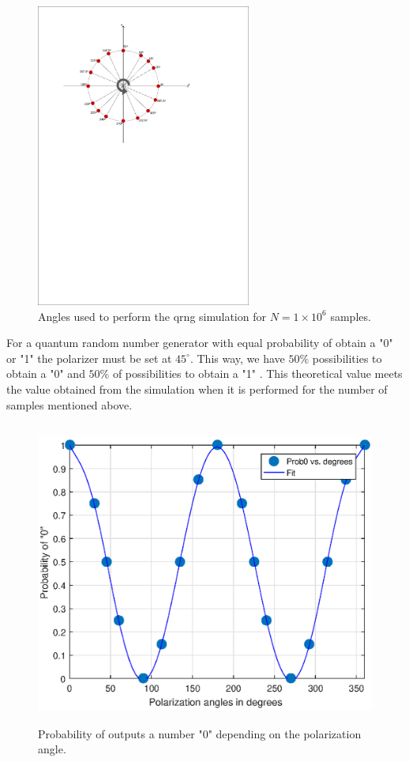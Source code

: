 \begin{figure}[H]
    \centering
        \includegraphics[clip, trim=0.5cm 15.5cm 2.5cm 1cm, height = 10cm]{./sdf/quantum_random_number_generator/figures/sphere.pdf}
    \caption{Angles used to perform the qrng simulation for $N=1 \times 10^{6}$ samples. }\label{sphere}
\end{figure}

For a quantum random number generator with equal probability of obtain a "0" \space or "1" \space the polarizer must be set at $45^{\circ}$. This way, we have $50\%$ possibilities to obtain a "0" \space and $50\%$ of possibilities to obtain a "1" \space. This theoretical value meets the value obtained from the simulation when it is performed for the number of samples mentioned above.

\begin{figure}[H]
    \centering
        \includegraphics[width=15cm,height=10cm]{./sdf/quantum_random_number_generator/figures/prob0.eps}
    \caption{Probability of outputs a number "0" \space depending on the polarization angle.}\label{probx}
\end{figure}


